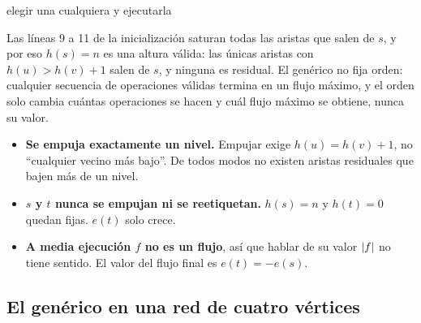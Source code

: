 \documentclass[11pt,letterpaper]{article}
\begin{document}
\begin{algorithm}[H]
\caption{\textsc{Empujar-Reetiquetar-Genérico}$(G)$
         \ (\textsc{Generic-Push-Relabel} en Cormen)}
\label{alg:empujar-reetiquetar-generico}
\begin{algorithmic}[1]
  \State {}
    \State elegir una cualquiera y ejecutarla
  \EndWhile
\EndProcedure
\end{algorithmic}
\end{algorithm}

Las líneas 9 a 11 de la inicialización saturan todas las aristas que
salen de $s$, y por eso $h(s) = n$ es una altura válida: las únicas
aristas con $h(u) > h(v) + 1$ salen de $s$, y ninguna es residual. El
genérico no fija orden: cualquier secuencia de operaciones válidas
termina en un flujo máximo, y el orden solo cambia cuántas operaciones
se hacen y cuál flujo máximo se obtiene, nunca su valor.

\begin{ojo}
  \begin{itemize}
    \item \textbf{Se empuja exactamente un nivel.} Empujar exige
          $h(u) = h(v) + 1$, no ``cualquier vecino más bajo''. De todos
          modos no existen aristas residuales que bajen más de un
          nivel.
    \item \textbf{$s$ y $t$ nunca se empujan ni se reetiquetan.}
          $h(s) = n$ y $h(t) = 0$ quedan fijas. $e(t)$ solo crece.
    \item \textbf{A media ejecución $f$ no es un flujo}, así que
          hablar de su valor $\left\lvert f \right\rvert$ no tiene sentido. El valor del
          flujo final es $e(t) = -e(s)$.
  \end{itemize}
\end{ojo}


\subsection*{El genérico en una red de cuatro vértices}
\end{document}

